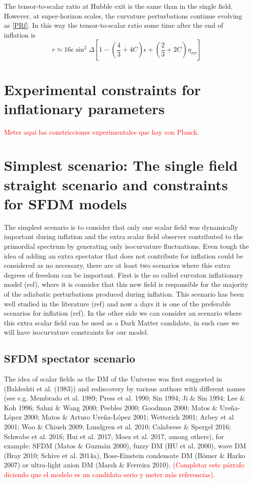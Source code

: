 \documentclass[twocolumn,           %
               showpacs,            %
               preprintnumbers,     %
               aps,                 %
               prl,          	    %
               letterpaper,             %
               superscriptaddress,      %
               nofootinbib,         %
               tightenlines,        %
               floats,floatfix      %
               ,usenatbib,
               ]{revtex4-1}
\begin{document}
The tensor-to-scalar ratio at Hubble exit is the same than in the single field. However, at super-horizon scales, the curvature perturbations continue evolving as \eqref{PRf}. In this way the tensor-to-scalar ratio some time after the end of inflation is
\begin{equation}\label{Tensortoscalar}
r\simeq 16\epsilon \sin^2\Delta\left[1-\left(\frac{4}{3}+4C\right)\epsilon +\left(\frac{2}{3}+2C\right)\eta_{\sigma\sigma}\right]
\end{equation}
\section{Experimental constraints for inflationary parameters}

\textcolor{red}{Meter aqu\'i las constricciones experimentales que hay con Planck.}

%
%
%
%
%
%
\section{Simplest scenario: The single field straight scenario and constraints for SFDM models}

The simplest scenario is to consider that only one scalar field was dynamically important during inflation and the extra scalar field observer contributed to the primordial spectrum by generating only isocurvature fluctuations. Even tough the idea of adding an extra spectator that does not contribute for inflation could be considered as no necessary, there are at least two scenarios where this extra degrees of freedom can be important. First is the so called curvaton inflationary model (ref), where it is consider that this new field is responsible for the majority of the adiabatic perturbations produced during inflation. This scenario has been well studied in the literature (ref) and now a days it is one of the preferable scenarios for inflation (ref). In the other side we can consider an scenario where this extra scalar field can be used as a Dark Matter candidate, in such case we will have isocurvature constraints for our model. 

\subsection{SFDM spectator scenario}
The idea of scalar fields as the DM of the Universe was first suggested in (Baldeshti et al. (1983)) and rediscovery by various authors with different names (see e.g. Membrado et al. 1989; Press et al. 1990; Sin 1994; Ji $\&$ Sin 1994; Lee $\&$ Koh 1996; Sahni $\&$ Wang 2000; Peebles 2000; Goodman 2000; Matos $\&$ Ure\~na-L\'opez 2000; Matos $\&$ Arturo Ure\~na-L\'opez 2001; Wetterich 2001; Arbey et al 2001; Woo $\&$ Chiueh 2009; Lundgren et al. 2010; Calabrese $\&$ Spergel 2016; Schwabe et al. 2016; Hui et al. 2017; Moez et al. 2017, among others), for example: SFDM (Matos $\&$ Guzm\'an 2000), fuzzy DM (HU et al. 2000), wave DM (Bray 2010; Schive et al. 2014a), Bose-Einstein condensate DM (B\"omer $\&$ Harko 2007) or ultra-light axion DM (Marsh $\&$ Ferreira 2010). \textcolor{red}{(Completar este p\'arrafo diciendo que el modelo es un candidato serio y meter m\'as referencias).} 
\end{document}
